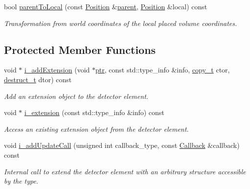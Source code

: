 \begin{DoxyCompactItemize}
bool \hyperlink{class_d_d4hep_1_1_geometry_1_1_det_element_a3203b4eaeb057b4ffbe0566626141af3}{parent\+To\+Local} (const \hyperlink{namespace_d_d4hep_1_1_geometry_a55083902099d03506c6db01b80404900}{Position} \&\hyperlink{class_d_d4hep_1_1_geometry_1_1_det_element_ab26ab7d0bd3b8641dbfc34b84d874979}{parent}, \hyperlink{namespace_d_d4hep_1_1_geometry_a55083902099d03506c6db01b80404900}{Position} \&local) const
\begin{DoxyCompactList}\small\item\em Transformation from world coordinates of the local placed volume coordinates. \end{DoxyCompactList}\end{DoxyCompactItemize}
\subsection*{Protected Member Functions}
\begin{DoxyCompactItemize}
\item 
void $\ast$ \hyperlink{class_d_d4hep_1_1_geometry_1_1_det_element_ae12f8a3f2e197c8bbad5c7f32778d876}{i\+\_\+add\+Extension} (void $\ast$\hyperlink{class_d_d4hep_1_1_handle_a6f165a9eec329d2d65172767b5f2777a}{ptr}, const std\+::type\+\_\+info \&info, \hyperlink{class_d_d4hep_1_1_geometry_1_1_det_element_a5eca2ca4ab2049faab552a0ad3f616a1}{copy\+\_\+t} ctor, \hyperlink{class_d_d4hep_1_1_geometry_1_1_det_element_a3fb2233645917aa646b957308fc750cf}{destruct\+\_\+t} dtor) const
\begin{DoxyCompactList}\small\item\em Add an extension object to the detector element. \end{DoxyCompactList}\item 
void $\ast$ \hyperlink{class_d_d4hep_1_1_geometry_1_1_det_element_ae97132812d6af3937c6ede0c53698233}{i\+\_\+extension} (const std\+::type\+\_\+info \&info) const
\begin{DoxyCompactList}\small\item\em Access an existing extension object from the detector element. \end{DoxyCompactList}\item 
void \hyperlink{class_d_d4hep_1_1_geometry_1_1_det_element_a7bc6c26e5ad1e4d32dc092462f5a769f}{i\+\_\+add\+Update\+Call} (unsigned int callback\+\_\+type, const \hyperlink{class_d_d4hep_1_1_callback}{Callback} \&callback) const
\begin{DoxyCompactList}\small\item\em Internal call to extend the detector element with an arbitrary structure accessible by the type. \end{DoxyCompactList}\end{DoxyCompactItemize}
